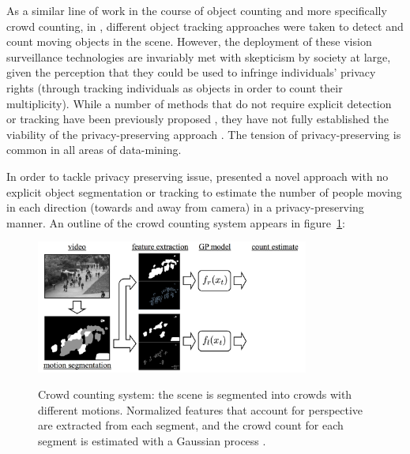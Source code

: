 \indent As a similar line of work in the course of object counting and more specifically crowd counting, in \cite{rabaud2006counting, leibe2007coupled}, different object tracking approaches were taken to detect and count moving objects in the scene. However, the deployment of these vision surveillance technologies are invariably met with skepticism by society at large, given the perception that they could be used to infringe individuals' privacy rights (through tracking individuals as objects in order to count their multiplicity). While a number of methods that do not require explicit detection or tracking have been previously proposed \cite{kong2005counting, marana1998efficacy, dong2007fast}, they have not fully established the viability of the privacy-preserving approach \cite{chan2008privacy}. The tension of privacy-preserving is common in all areas of data-mining. 

In order to tackle privacy preserving issue, \citet{chan2008privacy} presented a novel approach with no explicit object segmentation or tracking to estimate the number of people moving in each direction (towards and away from camera) in a privacy-preserving manner. An outline of the crowd counting system appears in figure~\ref{fig:ucsd}:
\begin{figure}[H]
	\centering
	{\includegraphics[width=0.8\textwidth]{images/ucsdOutline}}
	\caption{Crowd counting system: the scene is segmented into crowds with different motions. Normalized features that account for perspective are extracted from each segment, and the crowd count for each segment is estimated with a Gaussian process \cite{chan2008privacy}.}
	\label{fig:ucsd}
\end{figure}

